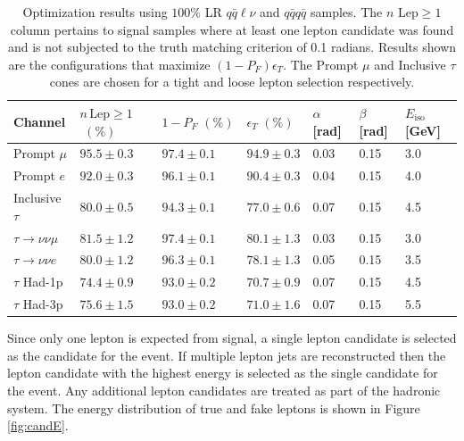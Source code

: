 \begin{table}

\begin{tabular}{|p{}|p{}p{}p{}p{}p{}p{}|}

\hline 
Channel & $n\,\text{Lep}\geq 1$ $\,\, (\%)$ & $1-P_{F} \, \, (\%)$ & $\epsilon_T \, \, (\%)$ & $\alpha$ [rad] & $\beta$ [rad] & $E_{\text{iso}}$ [GeV] \\ 
\hline 
Prompt $\mu$ & $95.5 \pm 0.3$ & $97.4 \pm 0.1$ & $94.9 \pm 0.3$ & 0.03 & 0.15 & 3.0 \\ 

Prompt $e$ & $92.0 \pm 0.3$ & $96.1 \pm 0.1$ & $90.4 \pm 0.3$ & 0.04 & 0.15 & 4.0 \\ 

Inclusive $\tau$ & $80.0 \pm 0.5$ & $94.3 \pm 0.1$ &  $77.0 \pm 0.6$ & 0.07 & 0.15 & 4.5 \\ 


 \hline
$\tau \rightarrow \nu \nu \mu$ & $81.5 \pm 1.2$ & $97.4 \pm 0.1$ & $80.1 \pm 1.3$ & 0.03 & 0.15 & 3.0 \\ 
 
$\tau \rightarrow \nu \nu e$ &  $80.0 \pm 1.2$ & $96.3 \pm 0.1$ &  $78.1 \pm 1.3$ & 0.05 & 0.15 & 3.5 \\ 
 
$\tau$ Had-1p & $74.4 \pm 0.9$ & $93.0 \pm 0.2$ & $70.7 \pm 0.9$ & 0.07 & 0.15 & 4.5 \\ 
 
$\tau$ Had-3p &  $75.6 \pm 1.5$ & $93.0 \pm 0.2$ & $71.0 \pm 1.6$ & 0.07 & 0.15 & 5.5  \\
\hline
\end{tabular} 
\caption{Optimization results using $100 \%$ LR $q\bar{q}\ell \nu$ and $q\bar{q} q\bar{q}$ samples. The $n \, \, \text{Lep} \geq 1$ column pertains to signal samples where at least one lepton candidate was found and is not subjected to the truth matching criterion of 0.1 radians. Results shown are the configurations that maximize $(1-P_F)\epsilon_T$. The Prompt $\mu$ and Inclusive $\tau$ cones are chosen for a tight and loose lepton selection respectively. }
\label{tab:taufinderopt}
\end{table}

Since only one lepton is expected from signal, a single lepton candidate is selected as the candidate for the event. If multiple lepton jets are reconstructed then the lepton candidate with the highest energy is selected as the single candidate for the event. Any additional lepton candidates are treated as part of the hadronic system. The energy distribution of true and fake leptons is shown in Figure \ref{fig:candE}.


